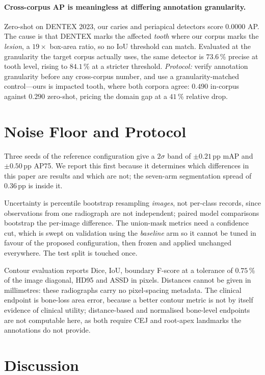 \documentclass[10pt,twocolumn,letterpaper]{article}
\begin{document}
\paragraph{Cross-corpus AP is meaningless at differing annotation granularity.}
Zero-shot on DENTEX 2023, our caries and periapical detectors score $0.0000$ AP.
The cause is that DENTEX marks the affected \emph{tooth} where our corpus marks
the \emph{lesion}, a $19\times$ box-area ratio, so no IoU threshold can match.
Evaluated at the granularity the target corpus actually uses, the same detector is
$73.6$\,\% precise at tooth level, rising to $84.1$\,\% at a stricter threshold.
\emph{Protocol:} verify annotation granularity before any cross-corpus number,
and use a granularity-matched control---ours is impacted tooth, where both corpora
agree: $0.490$ in-corpus against $0.290$ zero-shot, pricing the domain gap at a
$41$\,\% relative drop.

\section{Noise Floor and Protocol}

Three seeds of the reference configuration give a $2\sigma$ band of
$\pm0.21$\,pp mAP and $\pm0.50$\,pp AP75. We report this first because it
determines which differences in this paper are results and which are not; the
seven-arm segmentation spread of $0.36$\,pp is inside it.

Uncertainty is percentile bootstrap resampling \emph{images}, not per-class
records, since observations from one radiograph are not independent; paired model
comparisons bootstrap the per-image difference. The union-mask metrics need a
confidence cut, which is swept on validation using the \emph{baseline} arm so it
cannot be tuned in favour of the proposed configuration, then frozen and applied
unchanged everywhere. The test split is touched once.

Contour evaluation reports Dice, IoU, boundary F-score at a tolerance of
$0.75$\,\% of the image diagonal, HD95 and ASSD in pixels. Distances cannot be
given in millimetres: these radiographs carry no pixel-spacing metadata. The
clinical endpoint is bone-loss area error, because a better contour metric is not
by itself evidence of clinical utility; distance-based and normalised bone-level
endpoints are not computable here, as both require CEJ and root-apex landmarks the
annotations do not provide.

\section{Discussion}
\end{document}
